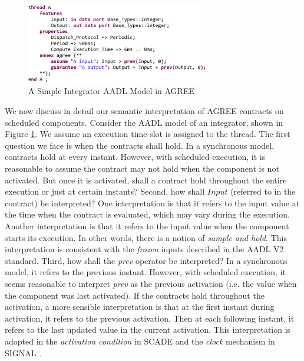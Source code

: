 \begin{figure}[t!]
\centering
\includegraphics[width=80mm]{pre.jpg}
\caption{A Simple Integrator AADL Model in AGREE\label{integratorFig}}
\end{figure}

We now discuss in detail our semantic interpretation of AGREE contracts on scheduled components.
Consider the AADL model of an integrator, shown in Figure \ref{integratorFig}. We assume an execution time slot is assigned to the thread.  
The first question we face is when the contracts shall hold. In a synchronous model, contracts hold at every instant. However, with scheduled execution, it is reasonable to assume the contract may not hold when the component is not activated. But once it is activated, shall a contract hold throughout the entire execution or just at certain instants? Second, how shall $Input$ (referred to in the contract) be interpreted? One interpretation is that it refers to the input value at the time when the contract is evaluated, which may vary during the execution. Another interpretation is that it refers to the input value when the component starts its execution. In other words, there is a notion of \emph{sample and hold}. This interpretation is consistent with the \emph{frozen} inputs described in the AADL V2 standard. Third, how shall the \emph{prev} operator be interpreted? In a synchronous model, it refers to the previous instant. However, with scheduled execution, it seems reasonable to interpret \emph{prev} as the previous activation (i.e. the value when the component was last activated). If the contracts hold throughout the activation, a more sensible interpretation is that at the first instant during activation, it refers to the previous activation. Then at each following instant, it refers to the last updated value in the current activation. This interpretation is adopted in the \emph{activation condition} in SCADE \cite{scade} and the \emph{clock} mechanism in SIGNAL \cite{signal}.

